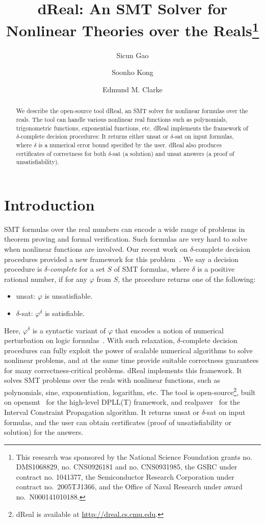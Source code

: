 \documentclass[envcountsect]{llncs}
\title{{\sf dReal}: An SMT Solver for Nonlinear Theories over the Reals\thanks{This research was sponsored by the National Science Foundation grants no. DMS1068829, no. CNS0926181 and no. CNS0931985, the GSRC under contract no. 1041377, the Semiconductor Research Corporation under contract no.~2005TJ1366, and the Office of Naval Research under award no.~N000141010188.}}
\author{Sicun Gao \and Soonho Kong \and Edmund M. Clarke}
\institute{Carnegie Mellon University, Pittsburgh, PA 15213}
\begin{document}
\maketitle

\begin{abstract}
We describe the open-source tool {\sf dReal}, an SMT solver for nonlinear formulas over the reals. The tool can handle various nonlinear real functions such as polynomials, trigonometric functions, exponential functions, etc. {\sf dReal} implements the framework of $\delta$-complete decision procedures: It returns either {\sf unsat} or {\sf $\delta$-sat} on input formulas, where $\delta$ is a numerical error bound specified by the user. {\sf dReal} also produces certificates of correctness for both {\sf $\delta$-sat} (a solution) and {\sf unsat} answers (a proof of unsatisfiability).  
\end{abstract}

\section{Introduction}

SMT formulas over the real numbers can encode a wide range of problems in theorem proving and formal verification. Such formulas are very hard to solve when nonlinear functions are involved. Our recent work on {$\delta$-complete decision procedures} provided a new framework for this problem~\cite{DBLP:conf/cade/GaoAC12,DBLP:conf/lics/GaoAC12}. We say a decision procedure is {\em $\delta$-complete} for a set $S$ of SMT formulas, where $\delta$ is a positive rational number, if for any $\varphi$ from $S$, the procedure returns one of the following:
\begin{itemize}
 \item {\sf unsat}: $\varphi$ is unsatisfiable.
 \item {\sf $\delta$-sat}: $\varphi^{\delta}$ is satisfiable.
\end{itemize}
Here, $\varphi^{\delta}$ is a syntactic variant of $\varphi$ that encodes a notion of numerical perturbation on logic formulas~\cite{DBLP:conf/cade/GaoAC12}. With such relaxation, $\delta$-complete decision procedures can fully exploit the power of scalable numerical algorithms to solve nonlinear problems, and at the same time provide suitable correctness guarantees for many correctness-critical problems. {\sf dReal} implements this framework. It solves SMT problems over the reals with nonlinear functions, such as polynomials, sine, exponentiation, logarithm, etc. The tool is open-source\footnote{{\sf dReal} is available at \url{http://dreal.cs.cmu.edu}.}, built on {\sf opensmt}~\cite{DBLP:conf/tacas/BruttomessoPST10} for the
high-level DPLL(T) framework, and {\sf
realpaver}~\cite{DBLP:journals/toms/GranvilliersB06} for the Interval
Constraint Propagation algorithm. It returns {\sf unsat} or {\sf $\delta$-sat}
on input formulas, and the user can obtain certificates (proof of
unsatisfiability or solution) for the answers.
\end{document}
